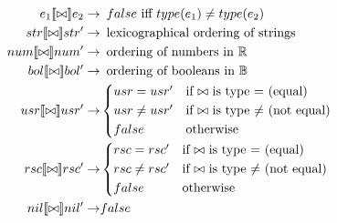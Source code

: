 \begin{align*}
    e_1 [\![ \bowtie ]\!] e_2 \imply& \enskip false \text{ iff } type(e_1) \neq type(e_2) \\
    str [\![ \bowtie ]\!] str' \imply& \enskip \text{lexicographical ordering of strings} \\
    num [\![ \bowtie ]\!] num' \imply& \enskip \text{ordering of numbers in } \mathbb{R} \\
    bol [\![ \bowtie ]\!] bol' \imply& \enskip \text{ordering of booleans in } \mathbb{B} \\
    usr [\![ \bowtie ]\!] usr' \imply&
        \begin{cases*}
            usr = usr'      & if $\bowtie$ is type $=$ (equal) \\
            usr \neq usr'   & if $\bowtie$ is type $\neq$ (not equal) \\
            false       & otherwise
        \end{cases*} \\
    rsc [\![ \bowtie ]\!] rsc' \imply&
        \begin{cases*}
            rsc = rsc'      & if $\bowtie$ is type $=$ (equal) \\
            rsc \neq rsc'   & if $\bowtie$ is type $\neq$ (not equal) \\
            false       & otherwise
        \end{cases*} \\
    nil [\![ \bowtie ]\!] nil' \imply& false
\end{align*}

